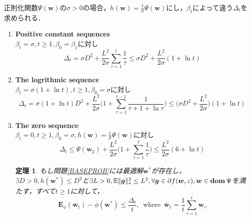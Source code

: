 \documentclass[a4paper,11pt]{jsarticle}
\newtheorem{theorem}{定理}
\numberwithin{theorem}{section}  %
\numberwithin{equation}{section} %
\newcommand{\dom}{\mathop{\mathrm{\bf dom}}\nolimits}
\begin{document}
正則化関数$\Psi(\bm{w})$の$\sigma > 0$の場合，$h(\bm{w})=\frac{1}{\sigma} \Psi(\bm{w})$にし，$\beta_t$によって違う$\Delta_t$を求められる．
\begin{enumerate}
\item \textbf{Positive constant sequences}\\
$\beta_t = \sigma, t\ge 1,\beta_0 = \beta_1$に対し
\begin{equation}
\Delta_t = \sigma D^2 + \frac{L^2}{2\sigma}\sum_{\tau=1}^t \frac{1}{\tau} \le \sigma D^2 + \frac{L^2}{2\sigma}(1+\ln t)
\end{equation}

\item \textbf{The logrithmic sequence}\\
$\beta_t = \sigma(1+\ln t), t\ge 1, \beta_0=\sigma$に対し
\begin{equation}
\Delta_t = \sigma(1+\ln t)D^2 + \frac{L^2}{2\sigma}\Bigr( 1+ \sum_{\tau=1}^{t-1} \frac{1}{\tau + 1 + \ln \tau} \Bigr) \le \Bigr( \sigma D^2 + \frac{L^2}{2\sigma} \Bigr)(1+\ln t)
\end{equation}

\item \textbf{The zero sequence}\\
$\beta_t = 0, t\ge 1, \beta_0 = \sigma, h(\bm{w})=\frac{1}{\sigma} \Psi(\bm{w})$に対し
\begin{equation}
\Delta_t \le \Psi(\bm{w}_2) + \frac{L^2}{2\sigma}\Bigr( 1+\sum_{\tau=1}^t \frac{1}{\tau} \Bigr) \le \frac{L^2}{2\sigma}(6 + \ln t)
\end{equation}

\begin{theorem}
もし問題\eqref{BASEPROB}には最適解$\bm{w}^*$が存在し，$\exists D>0,h(\bm{w}^*) \le D^2$と$\exists L >0, \mathbb{E}\| \bm{g} \|_*^2 \le L^2, \forall \bm{g} \in \partial f(\bm{w},z), \bm{w} \in \dom \Psi$を満たす，すべて$t \ge 1$に対して，
\begin{equation}
\bm{E}_{\phi}(\bar{\bm{w}}_t) - \phi(\bm{w}^*) \le \frac{\Delta_t}{t}, \,\,\,\text{where}\,\,\, \bar{\bm{w}}_t = \frac{1}{t}\sum_{\tau=1}^{t} \bm{w}_\tau
\end{equation}
\end{theorem}


\end{enumerate}
\end{document}
